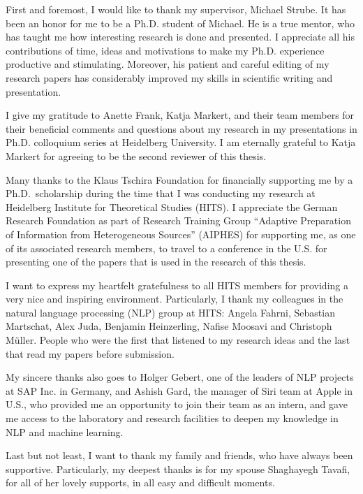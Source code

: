 
First and foremost, I would like to thank my supervisor, Michael Strube. 
It has been an honor for me to be a Ph.D. student of Michael. 
He is a true mentor, who has taught me how interesting research is done and presented. 
I appreciate all his contributions of time, ideas and motivations to make my Ph.D. experience productive and stimulating. 
Moreover, his patient and careful editing of my research papers has considerably improved my skills in scientific writing and presentation. 

I give my gratitude to Anette Frank, Katja Markert, and their team members for their beneficial comments and questions about my research in my presentations in Ph.D. colloquium series at Heidelberg University. 
I am eternally grateful to Katja Markert for agreeing to be the second reviewer of this thesis. 

Many thanks to the Klaus Tschira Foundation for financially supporting me by a Ph.D.\ scholarship during the time that I was conducting my research at Heidelberg Institute for Theoretical Studies (HITS). 
I appreciate the German Research Foundation as part of Research Training Group “Adaptive Preparation of Information from Heterogeneous Sources” (AIPHES) for supporting me, as one of its associated research members, to travel to a conference in the U.S. for presenting one of the papers that is used in the research of this thesis.  

I want to express my heartfelt gratefulness to all HITS members for providing a very nice and inspiring environment. 
Particularly, I thank my colleagues in the natural language processing (NLP) group at HITS:
Angela Fahrni, Sebastian Martschat, Alex Juda, Benjamin Heinzerling, Nafise Moosavi and Christoph M{\"u}ller. 
People who were the first that listened to my research ideas and the last that read my papers before submission. 

My sincere thanks also goes to Holger Gebert, one of the leaders of NLP projects at SAP Inc. in Germany, and Ashish Gard, the manager of Siri team at  Apple in U.S., who provided me an opportunity to join their team as an intern, and gave me access to the laboratory and research facilities to deepen my knowledge in NLP and machine learning. 

Last but not least, I want to thank my family and friends, who have always been supportive. 
Particularly, my deepest thanks is for my spouse Shaghayegh Tavafi, for all of her lovely supports, in all easy and difficult moments. 
